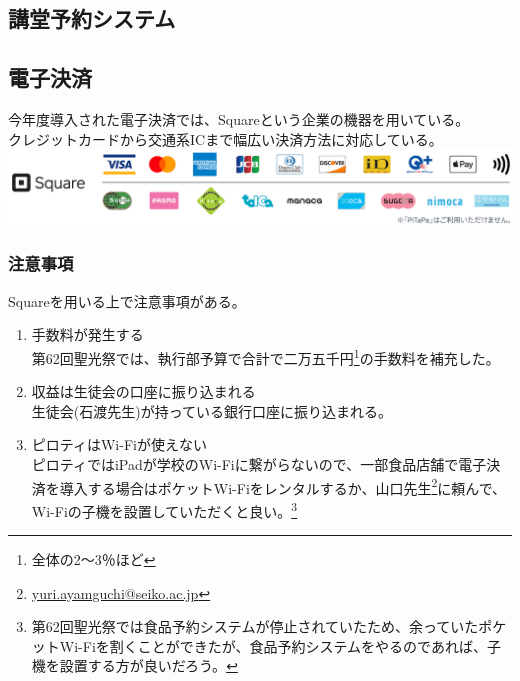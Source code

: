 \documentclass[dvipdfmx,jb5]{jarticle}
\begin{document}
 \subsection{講堂予約システム}
 \subsection{電子決済}
 今年度導入された電子決済では、Squareという企業の機器を用いている。\\
 クレジットカードから交通系ICまで幅広い決済方法に対応している。\\
 \includegraphics[scale=0.15]{assets/square_availability.png}
 \subsubsection{注意事項}
 Squareを用いる上で注意事項がある。
 \begin{enumerate}[注意1]
  \item 手数料が発生する\\
  第62回聖光祭では、執行部予算で合計で二万五千円\footnote{全体の2〜3％ほど}の手数料を補充した。
  \item 収益は生徒会の口座に振り込まれる\\
  生徒会(石渡先生)が持っている銀行口座に振り込まれる。
  \item ピロティはWi-Fiが使えない\\
  ピロティではiPadが学校のWi-Fiに繋がらないので、一部食品店舗で電子決済を導入する場合はポケットWi-Fiをレンタルするか、山口先生\footnote{\url{yuri.ayamguchi@seiko.ac.jp}}に頼んで、Wi-Fiの子機を設置していただくと良い。\footnote{第62回聖光祭では食品予約システムが停止されていたため、余っていたポケットWi-Fiを割くことができたが、食品予約システムをやるのであれば、子機を設置する方が良いだろう。}
 \end{enumerate}
\end{document}
